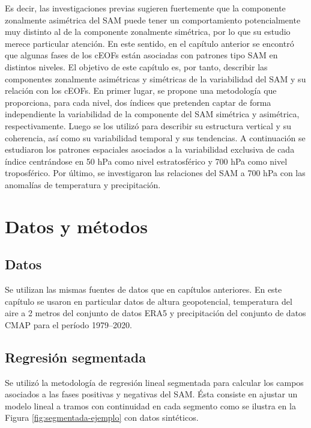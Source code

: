 \documentclass[12pt,oneside,a4paper]{reedthesis}
\begin{document}
Es decir, las investigaciones previas sugieren fuertemente que la componente zonalmente asimétrica del SAM puede tener un comportamiento potencialmente muy distinto al de la componente zonalmente simétrica, por lo que su estudio merece particular atención.
En este sentido, en el capítulo anterior se encontró que algunas fases de los cEOFs están asociadas con patrones tipo SAM en distintos niveles.
El objetivo de este capítulo es, por tanto, describir las componentes zonalmente asimétricas y simétricas de la variabilidad del SAM y su relación con los cEOFs.
En primer lugar, se propone una metodología que proporciona, para cada nivel, dos índices que pretenden captar de forma independiente la variabilidad de la componente del SAM simétrica y asimétrica, respectivamente.
Luego se los utilizó para describir su estructura vertical y su coherencia, así como su variabilidad temporal y sus tendencias.
A continuación se estudiaron los patrones espaciales asociados a la variabilidad exclusiva de cada índice centrándose en 50 hPa como nivel estratosférico y 700 hPa como nivel troposférico.
Por último, se investigaron las relaciones del SAM a 700 hPa con las anomalías de temperatura y precipitación.

\hypertarget{datos-y-muxe9todos}{%
\section{Datos y métodos}\label{datos-y-muxe9todos}}

\hypertarget{datos-2}{%
\subsection{Datos}\label{datos-2}}

Se utilizan las mismas fuentes de datos que en capítulos anteriores.
En este capítulo se usaron en particular datos de altura geopotencial, temperatura del aire a 2 metros del conjunto de datos ERA5 y precipitación del conjunto de datos CMAP para el período 1979--2020.

\hypertarget{regresiuxf3n-segmentada}{%
\subsection{Regresión segmentada}\label{regresiuxf3n-segmentada}}

Se utilizó la metodología de regresión lineal segmentada para calcular los campos asociados a las fases positivas y negativas del SAM.
Ésta consiste en ajustar un modelo lineal a tramos con continuidad en cada segmento como se ilustra en la Figura \ref{fig:segmentada-ejemplo} con datos sintéticos.
\end{document}
